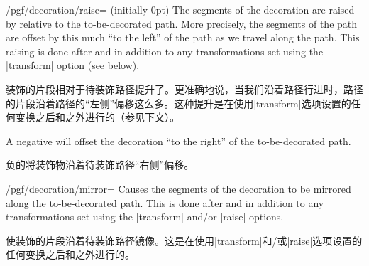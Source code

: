 \begin{key}{/pgf/decoration/raise= (initially 0pt)}
    The segments of the decoration are raised by  relative to
    the to-be-decorated path. More precisely, the segments of the path are
    offset by this much ``to the left'' of the path as we travel along the
    path. This raising is done after and in addition to any transformations set
    using the |transform| option (see below).

    装饰的片段相对于待装饰路径提升了。更准确地说，当我们沿着路径行进时，路径的片段沿着路径的“左侧”偏移这么多。这种提升是在使用|transform|选项设置的任何变换之后和之外进行的（参见下文）。

    A negative  will offset the decoration ``to the right'' of
    the to-be-decorated path.

    负的将装饰物沿着待装饰路径“右侧”偏移。
\begin{codeexample}[preamble={\usetikzlibrary{decorations.shapes}}]
\end{codeexample}
\end{key}

\begin{key}{/pgf/decoration/mirror=}
    Causes the segments of the decoration to be mirrored along the
    to-be-decorated path. This is done after and in addition to any
    transformations set using the |transform| and/or |raise| options.
    
    使装饰的片段沿着待装饰路径镜像。这是在使用|transform|和/或|raise|选项设置的任何变换之后和之外进行的。


\begin{codeexample}[preamble={\usetikzlibrary{decorations.pathreplacing}}]
\end{codeexample}
\end{key}

